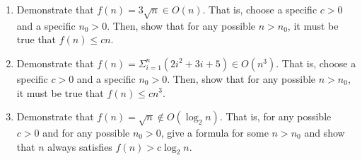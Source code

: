 \documentclass{article}
\begin{document}
\begin{enumerate}
\begin{enumerate}
  \item Demonstrate that
    \(f(n) = 3 \sqrt{n} \in O(n)\).
    That is, choose a specific \(c>0\) and a specific \(n_0 > 0\).
    Then, show that for any possible \(n > n_0\), it must be true that
    \(f(n) \leq c n\).

  \item Demonstrate that
    \(f(n) = \Sigma_{i=1}^{n} (2i^2+3i+5) \in O(n^3)\).
    That is, choose a specific \(c>0\) and a specific \(n_0 > 0\).
    Then, show that for any possible \(n > n_0\), it must be true that
    \(f(n) \leq c n^3\).

  \item Demonstrate that
    \(f(n) = \sqrt{n} \not\in O(\log_2 n)\).
    That is, for any possible \(c>0\) and for any possible \(n_0 > 0\), give a
    formula for some \(n > n_0\) and show that \(n\) always satisfies
    \(f(n) > c \log_2 n\).

  \end{enumerate}

\end{enumerate}
\end{document}
